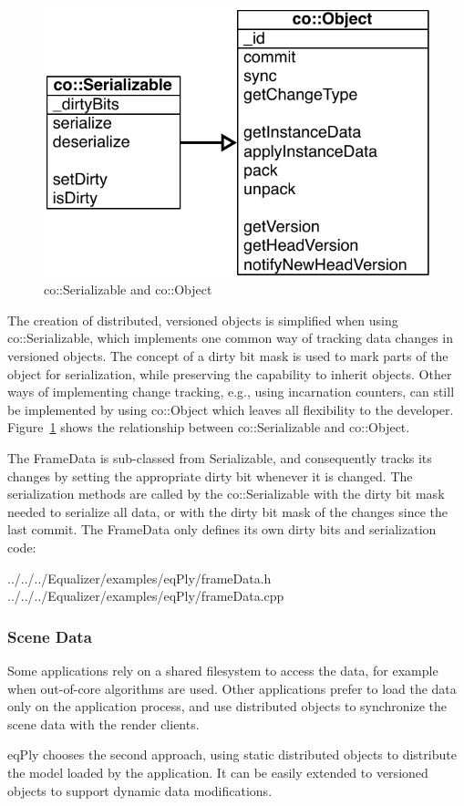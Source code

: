 \documentclass[10pt,a4]{scrartcl}
\newcommand{\fig}[1]{Figure~\ref{#1}}
\begin{document}
\begin{figure}
  \includegraphics[width=.382\textwidth]{images/umlObject.pdf}
  {\caption{\label{fUMLObject}co::Serializable and co::Object}}
\end{figure}
The creation of distributed, versioned objects is simplified when using
\textsf{co::Serializable}, which implements one common way of tracking
data changes in versioned objects. The concept of a dirty bit mask is used to
mark parts of the object for serialization, while preserving the capability to
inherit objects. Other ways of implementing change tracking, e.g., using
incarnation counters, can still be implemented by using \textsf{co::Object}
which leaves all flexibility to the developer. \fig{fUMLObject} shows the
relationship between \textsf{co::Serializable} and \textsf{co::Object}.

The \textsf{FrameData} is sub-classed from \textsf{Serializable}, and
consequently tracks its changes by setting the appropriate dirty bit whenever it
is changed. The serialization methods are called by the
\textsf{co::Serializable} with the dirty bit mask needed to serialize
all data, or with the dirty bit mask of the changes since the last
\textsf{commit}. The \textsf{FrameData} only defines its own dirty bits and
serialization code:

{\footnotesize
  {../../../Equalizer/examples/eqPly/frameData.h}}
{\footnotesize
  {../../../Equalizer/examples/eqPly/frameData.cpp}}


\subsubsection{\label{sSceneData}Scene Data}

Some applications rely on a shared filesystem to access the data, for example
when out-of-core algorithms are used. Other applications prefer to load the data
only on the application process, and use distributed objects to synchronize the
scene data with the render clients.

\textsf{eqPly} chooses the second approach, using static distributed objects to
distribute the model loaded by the application. It can be easily extended to
versioned objects to support dynamic data modifications.
\end{document}
